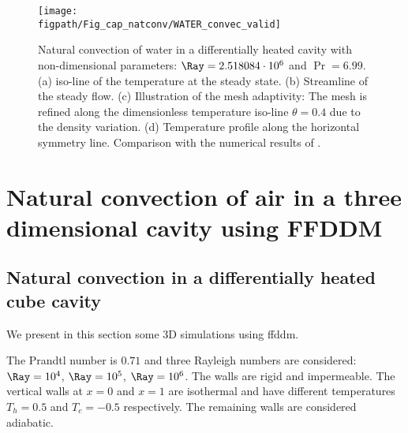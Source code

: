 \begin{figure}
	\begin{center}
		\texttt{[image: \\figpath/Fig\_cap\_natconv/WATER\_convec\_valid]}
	\end{center}
	\caption{Natural convection of water in a differentially heated cavity with non-dimensional parameters: $\Ray=2.518084\cdot 10^{6}$ and $\Pr=6.99$. (a) iso-line of the temperature at the steady state. (b) Streamline of the steady flow. (c) Illustration of the mesh adaptivity: The mesh is refined along the dimensionless temperature iso-line $\theta = 0.4$ due to the density variation. (d) Temperature profile along the horizontal symmetry line. Comparison with the numerical results of \cite{Kowalewski-2003}.}
	\label{fig-T1w-isoT} %
\end{figure}

\section{Natural convection of air in a three dimensional cavity using FFDDM}\label{sec: natconv-air-3D}

\subsection{Natural convection in a differentially heated cube cavity}
We present in this section some 3D simulations using ffddm.

The Prandtl number is $0.71$ and three Rayleigh numbers are considered:  $\Ray=10^4$, $\Ray=10^5$, $\Ray=10^6$. The walls are rigid and impermeable. The vertical walls at $x=0$ and $x=1$ are isothermal and have different temperatures $T_h=0.5$ and $T_c=-0.5$ respectively. The remaining walls are considered adiabatic. %
 
